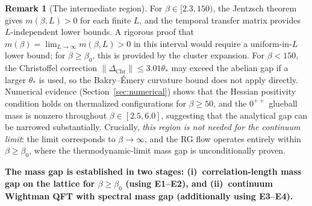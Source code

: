 \documentclass[11pt]{article}
\theoremstyle{definition}
\newtheorem{remark}[theorem]{Remark}
\begin{document}
\begin{remark}[The intermediate region]\label{rem:crossover}
For $\beta\in[2.3,150)$, the Jentzsch theorem gives $m(\beta,L)>0$
for each finite $L$, and the temporal transfer matrix provides
$L$-independent lower bounds.  A rigorous proof
that $m(\beta)=\lim_{L\to\infty}m(\beta,L)>0$ in this interval
would require a uniform-in-$L$ lower bound; for $\beta\ge\beta_0$,
this is provided by the cluster expansion.
For $\beta<150$, the Christoffel correction
$\|\Delta_{\mathrm{Chr}}\|\le 3.01\theta_*$ may exceed the abelian
gap if a larger $\theta_*$ is used, so the Bakry--\'Emery curvature
bound does not apply directly.
Numerical evidence (Section~\ref{sec:numerical}) shows that the
Hessian positivity condition holds on thermalized configurations for
$\beta\ge 50$, and the $0^{++}$ glueball mass is nonzero throughout
$\beta\in[2.5,6.0]$, suggesting that the analytical gap can be
narrowed substantially.
Crucially, \emph{this region is not needed for the
continuum limit}: the limit corresponds to $\beta\to\infty$, and
the RG flow operates entirely within $\beta\ge\beta_0$, where the
thermodynamic-limit mass gap is unconditionally proven.
\end{remark}

\textbf{The mass gap is established in two stages:
(i)~correlation-length mass gap on the lattice for $\beta\ge\beta_0$
(using E1--E2), and (ii)~continuum Wightman QFT with spectral
mass gap (additionally using E3--E4).}
\end{document}
